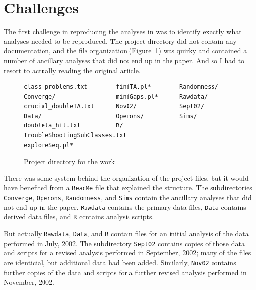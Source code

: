 \section{Challenges}

The first challenge in reproducing the analyses
in \citet{lamichhane2003} was to identify exactly what analyses needed
to be reproduced. The project directory did not contain any
documentation, and the file organization (Figure~\ref{fig:files}) was
quirky and contained a number of ancillary analyses that did not end
up in the paper. And so I had to resort to actually reading the
original article.



\begin{figure}

\begin{lstlisting}
class_problems.txt        findTA.pl*        Randomness/
Converge/                 mindGaps.pl*      Rawdata/
crucial_doubleTA.txt      Nov02/            Sept02/
Data/                     Operons/          Sims/
doubleta_hit.txt          R/                TroubleShootingSubClasses.txt
exploreSeq.pl*
\end{lstlisting}

\caption{Project directory for the work\label{fig:files}}
\end{figure}



There was some system behind the organization of the project files,
but it would have benefited from a \verb|ReadMe| file that
explained the structure. The
subdirectories \verb|Converge|, \verb|Operons|, \verb|Randomness|,
and \verb|Sims| contain the ancillary analyses that did not end up in the
paper. \verb|Rawdata| contains the primary data files, \verb|Data|
contains derived data files, and \verb|R| contains analysis scripts.

But actually \verb|Rawdata|, \verb|Data|, and \verb|R| contain files
for an initial analysis of the data performed in July, 2002. The subdirectory
\verb|Sept02| contains copies of those data and scripts
for a revised analysis performed in September, 2002; many of the files
are identicial, but additional data had been added.
Similarly, \verb|Nov02| contains further copies of the data and
scripts for a further revised analysis performed in November, 2002.

